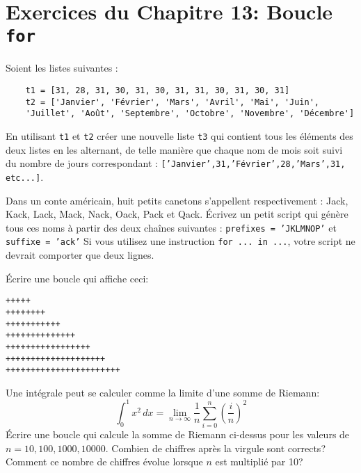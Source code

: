 
\section*{Exercices du Chapitre 13: Boucle \texttt{for}}


\begin{exercice}
Soient les listes suivantes :
\begin{verbatim}
    t1 = [31, 28, 31, 30, 31, 30, 31, 31, 30, 31, 30, 31]
    t2 = ['Janvier', 'Février', 'Mars', 'Avril', 'Mai', 'Juin',
    'Juillet', 'Août', 'Septembre', 'Octobre', 'Novembre', 'Décembre']
\end{verbatim}
En utilisant \texttt{t1} et \texttt{t2}
créer une nouvelle liste \texttt{t3} qui contient
tous les éléments des deux listes en les alternant, de telle manière
que chaque nom de mois soit suivi du nombre de jours correspondant :
\texttt{['Janvier',31,'Février',28,'Mars',31, etc...]}.
\end{exercice}

\begin{exercice}
Dans un conte américain, huit petits canetons s’appellent respectivement :
Jack, Kack, Lack, Mack, Nack, Oack, Pack et Qack. Écrivez un petit script qui
génère tous ces noms à partir des deux chaînes suivantes :
\texttt{prefixes = 'JKLMNOP'} et \texttt{suffixe = 'ack'}
Si vous utilisez une instruction \texttt{for ... in ...}, votre script ne devrait
comporter que deux lignes.
\end{exercice}

\begin{exercice}
Écrire une boucle qui affiche ceci:
{\footnotesize
\begin{verbatim}
+++++
++++++++
+++++++++++
++++++++++++++
+++++++++++++++++
++++++++++++++++++++
+++++++++++++++++++++++
\end{verbatim}
}
\end{exercice}

\begin{exercice}
    Une intégrale peut se calculer comme la limite d'une somme de Riemann:
    \[
	\int_0^1 x^2\,dx =
	\lim_{n\to\infty}\frac{1}{n}\sum_{i=0}^n{\left(\frac{i}{n}\right)^2}
    \]
    Écrire une boucle qui calcule la somme de Riemann ci-dessus pour les
    valeurs de $n=10, 100, 1000, 10000$. Combien de chiffres après la virgule
    sont corrects? Comment ce nombre de chiffres évolue lorsque $n$ est
    multiplié par 10?
\end{exercice}

